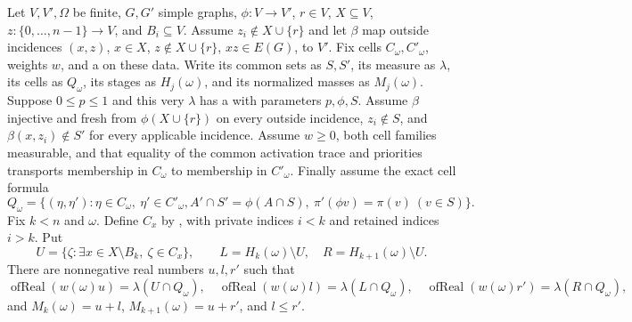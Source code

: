 \begin{lemma}
Let $V,V',\Omega$ be finite, $G,G'$ simple graphs, $\phi:V\to V'$,
$r\in V$, $X\subseteq V$, $z:\{0,\ldots,n-1\}\to V$, and
$B_i\subseteq V$. Assume $z_i\notin X\cup\{r\}$ and let $\beta$ map
outside incidences $(x,z)$, $x\in X$, $z\notin X\cup\{r\}$, $xz\in E(G)$,
to $V'$. Fix cells $C_\omega,C'_\omega$, weights $w$, and a
 on these
data. Write its common sets as $S,S'$, its measure as $\lambda$, its cells
as $Q_\omega$, its stages as $H_j(\omega)$, and its normalized masses
as $M_j(\omega)$. Suppose $0\le p\le1$ and this very $\lambda$ has a
 with parameters
$p,\phi,S$. Assume $\beta$ injective and fresh from
$\phi(X\cup\{r\})$ on every outside incidence, $z_i\notin S$, and
$\beta(x,z_i)\notin S'$ for every applicable incidence. Assume $w\ge0$,
both cell families measurable, and that equality of the common activation
trace and priorities transports membership in $C_\omega$ to membership in
$C'_\omega$. Finally assume the exact cell formula
\[
 Q_\omega=\{(\eta,\eta'): \eta\in C_\omega,\ \eta'\in C'_\omega,
 A'\cap S'=\phi(A\cap S),\ \pi'(\phi v)=\pi(v)\ (v\in S)\}.
\]
Fix $k<n$ and $\omega$. Define $C_x$ by
, with private
indices $i<k$ and retained indices $i>k$. Put
\[
 U=\{\zeta:\exists x\in X\setminus B_k,\ \zeta\in C_x\},\qquad
 L=H_k(\omega)\setminus U,\quad R=H_{k+1}(\omega)\setminus U.
\]
There are nonnegative real numbers $u,l,r'$ such that
\[
 \operatorname{ofReal}(w(\omega)u)=\lambda(U\cap Q_\omega),\quad
 \operatorname{ofReal}(w(\omega)l)=\lambda(L\cap Q_\omega),\quad
 \operatorname{ofReal}(w(\omega)r')=\lambda(R\cap Q_\omega),
\]
and $M_k(\omega)=u+l$, $M_{k+1}(\omega)=u+r'$, and $l\le r'$.
\end{lemma}
